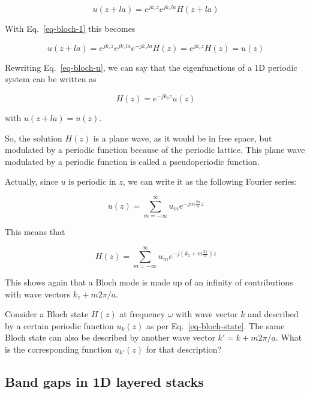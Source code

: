 \begin{equation}
u(z+la)= e^{j k_z z} e^{j k_z l a} H(z + l a)
\end{equation} 

With Eq.~\ref{eq-bloch-1} this becomes

\begin{equation}
u(z+l a)= e^{j k_z z} e^{j k_z l a} e^{-j k_z l a} H(z) = e^{j k_z z} H(z) = u(z)
\end{equation} 

Rewriting Eq.~\ref{eq-bloch-u}, we can say that the eigenfunctions of a 1D periodic system can be written as

\begin{equation}
H(z) = e^{-j k_z z} u(z) \label{eq-bloch-state}
\end{equation} 

with $u(z+l a) = u(z)$.

So, the solution $H(z)$ is a plane wave, as it would be in free space, but modulated by a periodic function because of the periodic lattice. This plane wave modulated by a periodic function is called a pseudoperiodic function.

Actually, since $u$ is periodic in $z$, we can write it as the following Fourier series:

\begin{equation}
u(z) =  \sum_{m=-\infty}^{\infty} u_m {e^{-j m \frac{2 \pi}{a} z}}
\end{equation} 

This means that

\begin{equation}
H(z)=  \sum_{m=-\infty}^{\infty} u_m {e^{-j \left( k_z + m \frac{2 \pi}{a} \right) z}}
\end{equation} 

This shows again that a Bloch mode is made up of an infinity of contributions with wave vectors $k_z + m 2 \pi / a$.

\begin{sidebar}
\begin{ex}
Consider a Bloch state $H(z)$ at frequency $\omega$ with wave vector $k$ and described by a certain periodic function $u_k(z)$ as per Eq.~\ref{eq-bloch-state}. The same Bloch state can also be described by another wave vector $k' = k+m 2 \pi / a$. What is the corresponding function $u_{k'}(z)$ for that description?
\end{ex}
\end{sidebar}

\subsection{Band gaps in 1D layered stacks}

